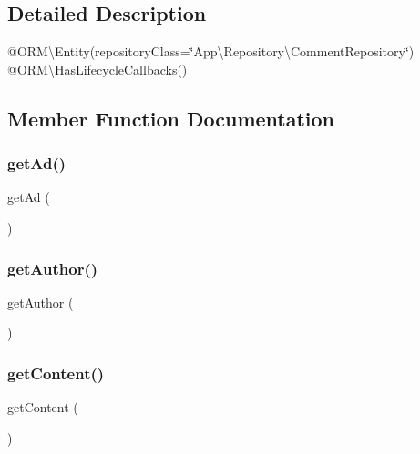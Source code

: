 \subsection{Detailed Description}
@\+O\+RM\textbackslash{}\+Entity(repository\+Class=\char`\"{}\+App\textbackslash{}\+Repository\textbackslash{}\+Comment\+Repository\char`\"{}) @\+O\+RM\textbackslash{}\+Has\+Lifecycle\+Callbacks() 

\subsection{Member Function Documentation}
\mbox{\label{class_app_1_1_entity_1_1_comment_acbaadb0b5b6f7e8ad6a9a0854e7fbf4c}} 
\subsubsection{\texorpdfstring{getAd()}{getAd()}}
{\footnotesize\ttfamily get\+Ad (\begin{DoxyParamCaption}{ }\end{DoxyParamCaption})}

\mbox{\label{class_app_1_1_entity_1_1_comment_a5286e30390ae3e1b274940286493dd24}} 
\subsubsection{\texorpdfstring{getAuthor()}{getAuthor()}}
{\footnotesize\ttfamily get\+Author (\begin{DoxyParamCaption}{ }\end{DoxyParamCaption})}

\mbox{\label{class_app_1_1_entity_1_1_comment_a58e43f09a06ce4e29b192c4e17ce7915}} 
\subsubsection{\texorpdfstring{getContent()}{getContent()}}
{\footnotesize\ttfamily get\+Content (\begin{DoxyParamCaption}{ }\end{DoxyParamCaption})}

